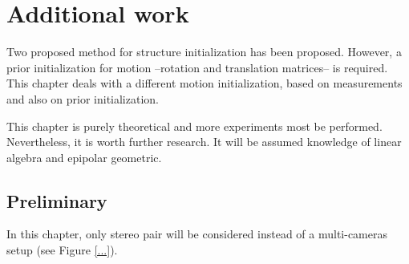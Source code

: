 \chapter{Additional work}
\label{cha:additional}

Two proposed method for structure initialization has been proposed. However, a prior initialization for motion --rotation and translation matrices-- is required. This chapter deals with a different motion initialization, based on measurements and also on prior initialization.

This chapter is purely theoretical and more experiments most be performed. Nevertheless, it is worth further research. It will be assumed knowledge of linear algebra and epipolar geometric.


\section{Preliminary}

In this chapter, only stereo pair will be considered instead of a multi-cameras setup (see Figure \ref{...}).

